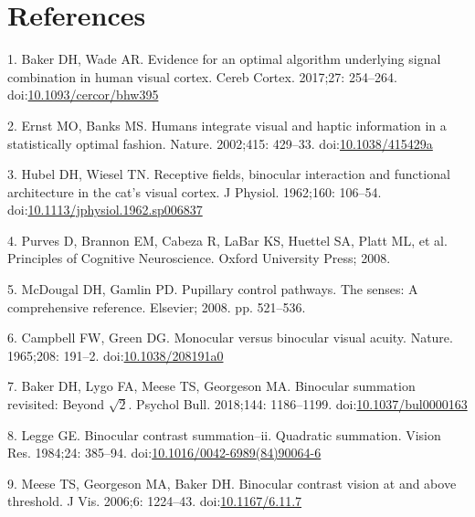 \documentclass[
]{article}
\begin{document}
\hypertarget{references}{%
\section*{References}\label{references}}

\hypertarget{refs}{}
\leavevmode\hypertarget{ref-Baker2017}{}%
1. Baker DH, Wade AR. Evidence for an optimal algorithm underlying signal combination in human visual cortex. Cereb Cortex. 2017;27: 254--264. doi:\href{https://doi.org/10.1093/cercor/bhw395}{10.1093/cercor/bhw395}

\leavevmode\hypertarget{ref-Ernst2002}{}%
2. Ernst MO, Banks MS. Humans integrate visual and haptic information in a statistically optimal fashion. Nature. 2002;415: 429--33. doi:\href{https://doi.org/10.1038/415429a}{10.1038/415429a}

\leavevmode\hypertarget{ref-Hubel1962}{}%
3. Hubel DH, Wiesel TN. Receptive fields, binocular interaction and functional architecture in the cat's visual cortex. J Physiol. 1962;160: 106--54. doi:\href{https://doi.org/10.1113/jphysiol.1962.sp006837}{10.1113/jphysiol.1962.sp006837}

\leavevmode\hypertarget{ref-Purves2008}{}%
4. Purves D, Brannon EM, Cabeza R, LaBar KS, Huettel SA, Platt ML, et al. Principles of Cognitive Neuroscience. Oxford University Press; 2008.

\leavevmode\hypertarget{ref-McDougal2008}{}%
5. McDougal DH, Gamlin PD. Pupillary control pathways. The senses: A comprehensive reference. Elsevier; 2008. pp. 521--536.

\leavevmode\hypertarget{ref-Campbell1965}{}%
6. Campbell FW, Green DG. Monocular versus binocular visual acuity. Nature. 1965;208: 191--2. doi:\href{https://doi.org/10.1038/208191a0}{10.1038/208191a0}

\leavevmode\hypertarget{ref-Baker2018}{}%
7. Baker DH, Lygo FA, Meese TS, Georgeson MA. Binocular summation revisited: Beyond \(\sqrt{2}\). Psychol Bull. 2018;144: 1186--1199. doi:\href{https://doi.org/10.1037/bul0000163}{10.1037/bul0000163}

\leavevmode\hypertarget{ref-Legge1984}{}%
8. Legge GE. Binocular contrast summation--ii. Quadratic summation. Vision Res. 1984;24: 385--94. doi:\href{https://doi.org/10.1016/0042-6989(84)90064-6}{10.1016/0042-6989(84)90064-6}

\leavevmode\hypertarget{ref-Meese2006}{}%
9. Meese TS, Georgeson MA, Baker DH. Binocular contrast vision at and above threshold. J Vis. 2006;6: 1224--43. doi:\href{https://doi.org/10.1167/6.11.7}{10.1167/6.11.7}
\end{document}
